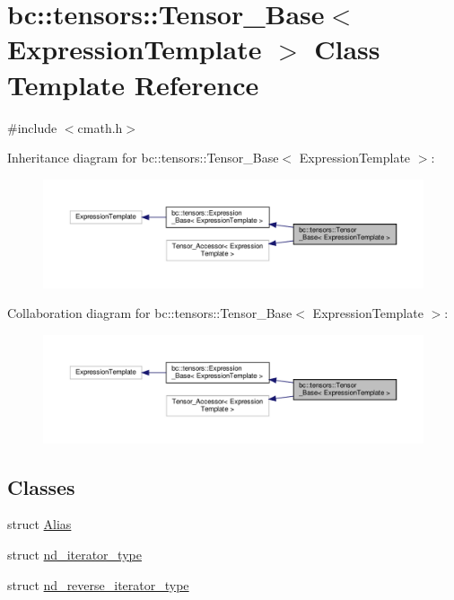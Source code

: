 \hypertarget{classbc_1_1tensors_1_1Tensor__Base}{}\section{bc\+:\+:tensors\+:\+:Tensor\+\_\+\+Base$<$ Expression\+Template $>$ Class Template Reference}
\label{classbc_1_1tensors_1_1Tensor__Base}


{\ttfamily \#include $<$cmath.\+h$>$}



Inheritance diagram for bc\+:\+:tensors\+:\+:Tensor\+\_\+\+Base$<$ Expression\+Template $>$\+:\nopagebreak
\begin{figure}[H]
\begin{center}
\leavevmode
\includegraphics[width=350pt]{classbc_1_1tensors_1_1Tensor__Base__inherit__graph}
\end{center}
\end{figure}


Collaboration diagram for bc\+:\+:tensors\+:\+:Tensor\+\_\+\+Base$<$ Expression\+Template $>$\+:\nopagebreak
\begin{figure}[H]
\begin{center}
\leavevmode
\includegraphics[width=350pt]{classbc_1_1tensors_1_1Tensor__Base__coll__graph}
\end{center}
\end{figure}
\subsection*{Classes}
\begin{DoxyCompactItemize}
\item 
struct \hyperlink{structbc_1_1tensors_1_1Tensor__Base_1_1Alias}{Alias}
\item 
struct \hyperlink{structbc_1_1tensors_1_1Tensor__Base_1_1nd__iterator__type}{nd\+\_\+iterator\+\_\+type}
\item 
struct \hyperlink{structbc_1_1tensors_1_1Tensor__Base_1_1nd__reverse__iterator__type}{nd\+\_\+reverse\+\_\+iterator\+\_\+type}
\end{DoxyCompactItemize}
